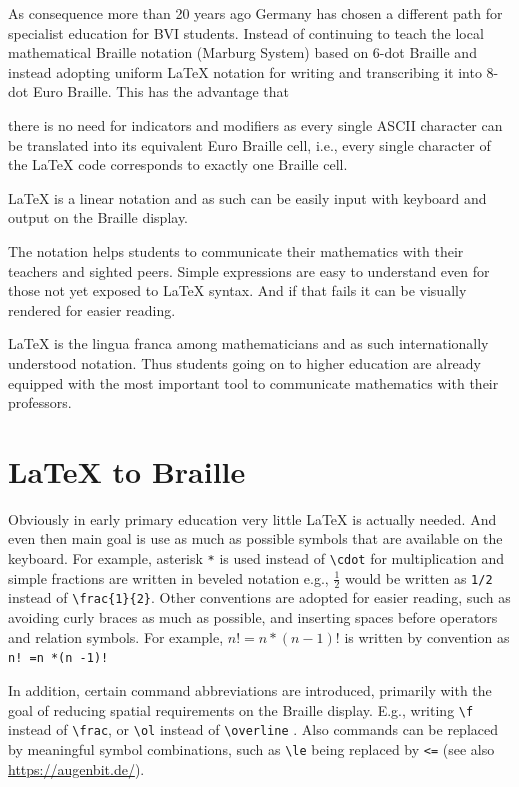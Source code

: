 \documentclass{article}
\begin{document}
As consequence more than 20 years ago Germany has chosen a different path for
specialist education for BVI students. Instead of continuing to teach the local
mathematical Braille notation (Marburg System) based on 6-dot Braille and instead
adopting uniform {\LaTeX} notation for writing and transcribing it into 8-dot
Euro Braille. This has the advantage that 
\begin{inparaenum}
\item there is no need for indicators and
  modifiers as every single ASCII character can be translated into its equivalent
  Euro Braille cell, i.e., every single character of the {\LaTeX} code corresponds
  to exactly one Braille cell.
\item {\LaTeX} is a linear notation and as such can be easily input with
  keyboard and output on the Braille display.
\item The notation helps students to communicate their mathematics with their
  teachers and sighted peers. Simple expressions are easy to understand even for
  those not yet exposed to {\LaTeX} syntax. And if that fails it can be visually
  rendered for easier reading.
\item {\LaTeX} is the lingua franca among mathematicians and as such
  internationally understood notation. Thus students going on to higher
  education are already equipped with the most important tool to communicate
  mathematics with their professors.
\end{inparaenum}


\section{{\LaTeX} to Braille}\label{sec:latex-to-braille}

Obviously in early primary education very little {\LaTeX} is actually
needed. And even then main goal is use as much as possible symbols that are
available on the keyboard. For example, asterisk \texttt{*} is used instead of
\verb+\cdot+ for multiplication and simple fractions are written in beveled
notation e.g., $\frac{1}{2}$ would be written as \texttt{1/2} instead of
\verb+\frac{1}{2}+. Other conventions are adopted for easier reading, such as
avoiding curly braces as much as possible, and inserting spaces before operators
and relation symbols. For example, ${ n! = n*(n-1)! }$ is written by convention
as \verb+n! =n *(n -1)!+

In addition, certain command abbreviations are introduced, primarily with the
goal of reducing spatial requirements on the Braille display. E.g., writing
\verb+\f+ instead of \verb+\frac+, or \verb+\ol+ instead of \verb+\overline+
. Also commands can be replaced by meaningful symbol combinations, such as
\verb+\le+ being replaced by \verb+<=+  (see also \url{https://augenbit.de/}).
\end{document}
